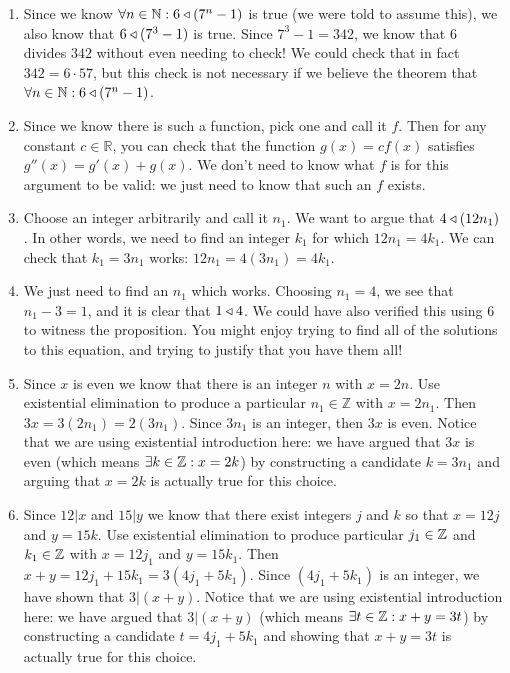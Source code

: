\begin{solutions}	
	\begin{enumerate}
		\item Since we know $\forall n \in \mathbb{N}: 6 \triangleleft (7^n-1)$ is true (we were told to assume this), we also know that $6 \triangleleft (7^3-1)$ is true. Since $7^3-1 = 342$, we know that $6$ divides $342$ without even needing to check!  We could check that in fact $342 = 6 \cdot 57$, but this check is not necessary if we believe the theorem that$\forall n \in \mathbb{N}: 6  \triangleleft  (7^n-1)$. 
		
		\item Since we know there is such a function, pick one and call it $f$.  Then for any constant $c \in \mathbb{R}$, you can check that the function $g(x) = cf(x)$ satisfies $g''(x) = g'(x)+g(x)$.  We don't need to know what $f$ is for this argument to be valid:  we just need to know that such an $f$ exists.
		
		\item Choose an integer arbitrarily and call it $n_1$.  We want to argue that $4 \triangleleft (12n_1)$.  In other words, we need to find an integer $k_1$ for which $12n_1 = 4k_1$.  We can check that $k_1 = 3n_1$ works:  $12n_1 = 4(3n_1) = 4k_1$.

		\item We just need to find an $n_1$ which works.  Choosing $n_1 = 4$, we see that $n_1 - 3 = 1$, and it is clear that $1 \triangleleft  4$.  We could have also verified this using $6$  to witness the proposition.  You might enjoy trying to find all of the solutions to this equation, and trying to justify that you have them all!
		
		\item Since $x$ is even we know that there is an integer $n$ with $x =2n$.  Use existential elimination to produce a particular $n_1 \in \mathbb{Z}$ with $x =2n_1$.  Then $3x  =3(2n_1) = 2(3n_1)$.  Since $3n_1$ is an integer, then $3x$ is even.  Notice that we are using existential introduction here:  we have argued that $3x$ is even (which means $\exists k \in \mathbb{Z} : x = 2k$) by constructing a candidate $k=3n_1$ and arguing that $x=2k$ is actually true for this choice.
		
		\item Since $12|x$ and $15|y$ we know that there exist integers $j$ and $k$ so that $x = 12j$ and $y=15k$.  Use existential elimination to produce particular $j_1 \in \mathbb{Z}$ and $k_1 \in \mathbb{Z}$ with $x = 12j_1$ and $y=15k_1$.  Then $x+y = 12j_1+15k_1 = 3(4j_1+5k_1)$.  Since $(4j_1+5k_1)$ is an integer, we have shown that $3|(x+y)$.  Notice that we are using existential introduction here:  we have argued that $3|(x+y)$ (which means $\exists t \in \mathbb{Z}: x+y = 3t$) by constructing a candidate $t = 4j_1+5k_1$ and showing that $x+y = 3t$ is actually true for this choice.
		 

\end{enumerate}
\end{solutions}
